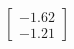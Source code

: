\documentclass[preview]{standalone}
\begin{document}
\begin{align*}
\begin{bmatrix} -1.62 \\ -1.21 \end{bmatrix}
\end{align*}
\end{document}
